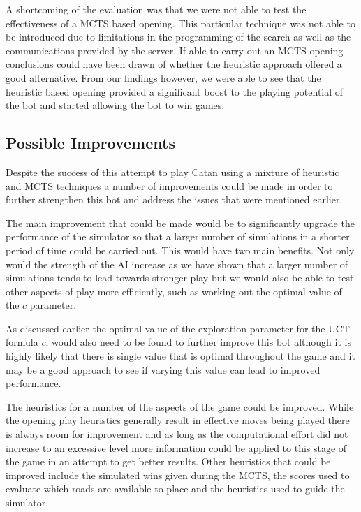 \documentclass[]{article}
\begin{document}
\par A shortcoming of the evaluation was that we were not able to test the effectiveness of a MCTS based opening. This particular technique was not able to be introduced due to limitations in the programming of the search as well as the communications provided by the server. If able to carry out an MCTS opening conclusions could have been drawn of whether the heuristic approach offered a good alternative. From our findings however, we were able to see that the heuristic based opening provided a significant boost to the playing potential of the bot and started allowing the bot to win games.

\subsection{Possible Improvements}
Despite the success of this attempt to play Catan using a mixture of heuristic and MCTS techniques a number of improvements could be made in order to further strengthen this bot and address the issues that were mentioned earlier.

\par The main improvement that could be made would be to significantly upgrade the performance of the simulator so that a larger number of simulations in a shorter period of time could be carried out. This would have two main benefits. Not only would the strength of the AI increase as we have shown that a larger number of simulations tends to lead towards stronger play but we would also be able to test other aspects of play more efficiently, such as working out the optimal value of the $c$ parameter.

\par As discussed earlier the optimal value of the exploration parameter for the UCT formula $c$, would also need to be found to further improve this bot although it is highly likely that there is single value that is optimal throughout the game and it may be a good approach to see if varying this value can lead to improved performance.

\par The heuristics for a number of the aspects of the game could be improved. While the opening play heuristics generally result in effective moves being played there is always room for improvement and as long as the computational effort did not increase to an excessive level more information could be applied to this stage of the game in an attempt to get better results. Other heuristics that could be improved include the simulated wins given during the MCTS, the scores used to evaluate which roads are available to place and the heuristics used to guide the simulator. 
\end{document}

